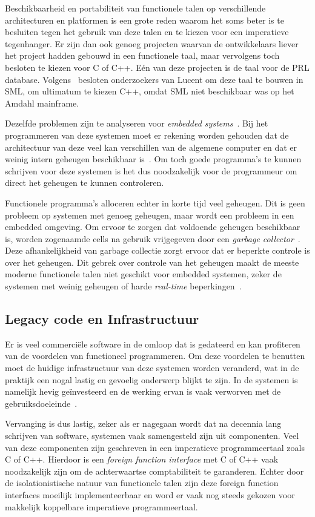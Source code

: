 \documentclass[twoside,twocolumn]{article}
\begin{document}
Beschikbaarheid en portabiliteit van functionele talen op verschillende
architecturen en platformen is een grote reden waarom het soms beter is te
besluiten tegen het gebruik van deze talen en te kiezen voor een imperatieve
tegenhanger. Er zijn dan ook genoeg projecten waarvan de ontwikkelaars liever
het project hadden gebouwd in een functionele taal, maar vervolgens toch
besloten te kiezen voor C of C++. E\'en van deze projecten is de taal voor de
PRL database. Volgens~\textcite{src19} besloten onderzoekers van Lucent om
deze taal te bouwen in SML, om ultimatum te kiezen C++, omdat SML niet
beschikbaar was op het Amdahl mainframe.

Dezelfde problemen zijn te analyseren voor
\textit{embedded systems}~\cite{src20}. Bij het programmeren van deze systemen
moet er rekening worden gehouden dat de architectuur van deze veel kan
verschillen van de algemene computer en dat er weinig intern geheugen
beschikbaar is~\cite{src21,src22}. Om toch goede programma's te kunnen
schrijven voor deze systemen is het dus noodzakelijk voor de programmeur om
direct het geheugen te kunnen controleren.

Functionele programma's alloceren echter in korte tijd veel geheugen. Dit is
geen probleem op systemen met genoeg geheugen, maar wordt een probleem in
een embedded omgeving. Om ervoor te zorgen dat voldoende geheugen beschikbaar
is, worden zogenaamde cells na gebruik vrijgegeven door een \textit{garbage
collector}~\cite{src23}. Deze afhankelijkheid van garbage collectie zorgt ervoor dat er
beperkte controle is over het geheugen. Dit gebrek over controle van het
geheugen maakt de meeste moderne functionele talen niet geschikt voor embedded
systemen, zeker de systemen met weinig geheugen of harde \textit{real-time}
beperkingen~\cite{src24}.

\subsection{Legacy code en Infrastructuur}
\label{subsec:4-2}

Er is veel commerci\"ele software in de omloop dat is gedateerd en kan
profiteren van de voordelen van functioneel programmeren. Om deze voordelen te
benutten moet de huidige infrastructuur van deze systemen worden veranderd, wat
in de praktijk een nogal lastig en gevoelig onderwerp blijkt te zijn. In de
systemen is namelijk hevig ge\"investeerd en de werking ervan is vaak verworven
met de gebruiksdoeleinde~\cite{src18,src25}.

Vervanging is dus lastig, zeker als er nagegaan wordt dat na decennia lang
schrijven van software, systemen vaak samengesteld zijn uit componenten. Veel
van deze componenten zijn geschreven in een imperatieve programmeertaal zoals C
of C++. Hierdoor is een \textit{foreign function interface} met C of C++ vaak
noodzakelijk zijn om de achterwaartse comptabiliteit te garanderen\cite{src19}.
Echter door de isolationistische natuur van functionele talen zijn deze foreign
function interfaces moeilijk implementeerbaar en word er vaak nog steeds
gekozen voor makkelijk koppelbare imperatieve programmeertaal.
\end{document}
